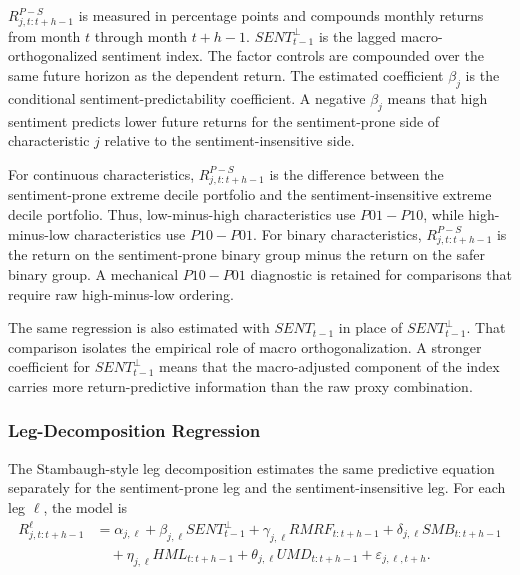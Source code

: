 \documentclass[11pt]{article}
\newcommand{\var}[1]{\ensuremath{#1}}
\begin{document}
\var{R^{P-S}_{j,t:t+h-1}} is measured in percentage points and compounds monthly returns from month \var{t} through month \var{t+h-1}. \var{SENT^{\perp}_{t-1}} is the lagged macro-orthogonalized sentiment index. The factor controls are compounded over the same future horizon as the dependent return. The estimated coefficient \var{\beta_j} is the conditional sentiment-predictability coefficient. A negative \var{\beta_j} means that high sentiment predicts lower future returns for the sentiment-prone side of characteristic \var{j} relative to the sentiment-insensitive side.

For continuous characteristics, \var{R^{P-S}_{j,t:t+h-1}} is the difference between the sentiment-prone extreme decile portfolio and the sentiment-insensitive extreme decile portfolio. Thus, low-minus-high characteristics use \var{P01-P10}, while high-minus-low characteristics use \var{P10-P01}. For binary characteristics, \var{R^{P-S}_{j,t:t+h-1}} is the return on the sentiment-prone binary group minus the return on the safer binary group. A mechanical \var{P10-P01} diagnostic is retained for comparisons that require raw high-minus-low ordering.

The same regression is also estimated with \var{SENT_{t-1}} in place of \var{SENT^{\perp}_{t-1}}. That comparison isolates the empirical role of macro orthogonalization. A stronger coefficient for \var{SENT^{\perp}_{t-1}} means that the macro-adjusted component of the index carries more return-predictive information than the raw proxy combination.

\subsubsection{Leg-Decomposition Regression}
The Stambaugh-style leg decomposition estimates the same predictive equation separately for the sentiment-prone leg and the sentiment-insensitive leg. For each leg \var{\ell}, the model is
\begin{equation}
    \begin{aligned}
    R^{\ell}_{j,t:t+h-1}
    &=
    \alpha_{j,\ell}
    + \beta_{j,\ell} SENT^{\perp}_{t-1}
    + \gamma_{j,\ell} RMRF_{t:t+h-1}
    + \delta_{j,\ell} SMB_{t:t+h-1} \\
    &\quad
    + \eta_{j,\ell} HML_{t:t+h-1}
    + \theta_{j,\ell} UMD_{t:t+h-1}
    + \varepsilon_{j,\ell,t+h}.
    \end{aligned}
\end{equation}
\end{document}
